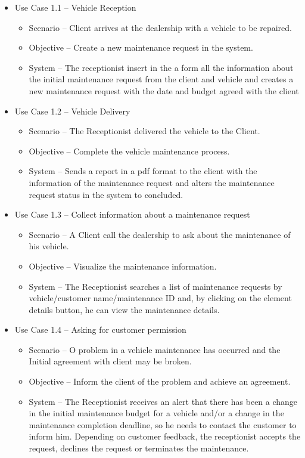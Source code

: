 \begin{itemize}
    \item Use Case 1.1 – Vehicle Reception
    \begin{itemize}
      \item Scenario – Client arrives at the dealership with a vehicle to be repaired.
      \item Objective – Create a new maintenance request in the system.
      \item System – The receptionist insert in the a form all the information about the initial maintenance request from the client and vehicle and creates a new maintenance request with the date and budget agreed with the client 
    \end{itemize}
    \item Use Case 1.2 – Vehicle Delivery 
    \begin{itemize}
      \item Scenario – The Receptionist delivered the vehicle to the Client.
      \item Objective – Complete the vehicle maintenance process.
      \item System – Sends a report in a pdf format to the client with the information of the maintenance request and alters the maintenance request status in the system to concluded. 
    \end{itemize}
    \item Use Case 1.3 – Collect information about a maintenance request
    \begin{itemize}
      \item Scenario – A Client call the dealership to ask about the maintenance of his vehicle.
      \item Objective – Visualize the maintenance information.
      \item System –  The Receptionist searches a list of maintenance requests by vehicle/customer name/maintenance ID and, by clicking on the element details button, he can view the maintenance details.
    \end{itemize}
    \item Use Case 1.4 – Asking for customer permission
    \begin{itemize}
      \item Scenario – O problem in a vehicle maintenance has occurred and the Initial agreement with client may be broken.
      \item Objective – Inform the client of the problem and achieve an agreement.
      \item System – The Receptionist receives an alert that there has been a change in the initial maintenance budget for a vehicle and/or a change in the maintenance completion deadline, so he needs to contact the customer to inform him. Depending on customer feedback, the receptionist accepts the request, declines the request or terminates the maintenance.
    \end{itemize}
  \end{itemize}  
  \hfill \break


